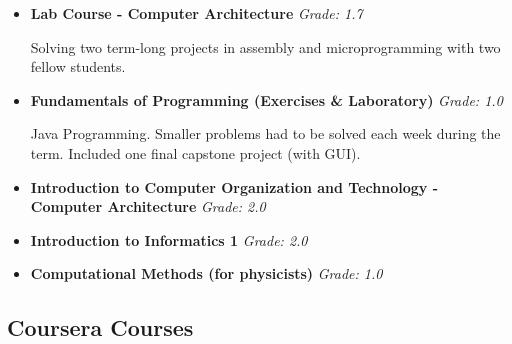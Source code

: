 \documentclass[11pt,a4paper,sans]{moderncv}        %
\begin{document}
\begin{itemize}

\item{\textbf{Lab Course - Computer Architecture} \textit{Grade: 1.7}

\vspace{2pt}

\small{Solving two term-long projects in assembly and microprogramming with two fellow students.}}

\item{\textbf{Fundamentals of Programming (Exercises \& Laboratory)} \textit{Grade: 1.0}

\vspace{2pt}
\small{Java Programming. Smaller problems had to be solved each week during the term. Included one final capstone project (with GUI).}}

\item{\textbf{Introduction to Computer Organization and Technology - Computer Architecture} \textit{Grade: 2.0}}

\item{\textbf{Introduction to Informatics 1} \textit{Grade: 2.0}}

\item{\textbf{Computational Methods (for physicists)} \textit{Grade: 1.0}}

\end{itemize}

\subsection{Coursera Courses}

\vspace{5pt}
\end{document}
